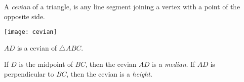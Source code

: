 \documentclass{article}
\begin{document}
A \emph{cevian} of a triangle, is any line segment joining a vertex with a point of the opposite side.

\begin{center}\texttt{[image: cevian]}\end{center}
$AD$ is a cevian of $\triangle ABC$.

If $D$ is the midpoint of $BC$, then the cevian $AD$ is a \emph{median}.  If $AD$ is perpendicular to $BC$, then the cevian is a \emph{height}.
\end{document}
